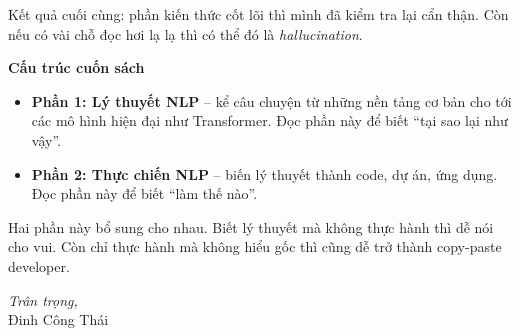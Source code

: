 Kết quả cuối cùng: phần kiến thức cốt lõi thì mình đã kiểm tra lại cẩn thận. 
Còn nếu  có vài chỗ đọc hơi lạ lạ thì có thể đó là \textit{hallucination}.


\vspace{1em}
\noindent
\textbf{Cấu trúc cuốn sách}  

\begin{itemize}[leftmargin=*]
    \item \textbf{Phần 1: Lý thuyết NLP} – kể câu chuyện từ những nền tảng cơ bản cho tới các mô hình hiện đại như Transformer. Đọc phần này để biết “tại sao lại như vậy”.  
    \item \textbf{Phần 2: Thực chiến NLP} – biến lý thuyết thành code, dự án, ứng dụng. Đọc phần này để biết “làm thế nào”.  
\end{itemize}

Hai phần này bổ sung cho nhau. Biết lý thuyết mà không thực hành thì dễ nói cho vui. Còn chỉ thực hành mà không hiểu gốc thì cũng dễ trở thành copy-paste developer.  

\begin{flushright}
\textit{Trân trọng,} \\[0.5em]
Đinh Công Thái
\end{flushright}
